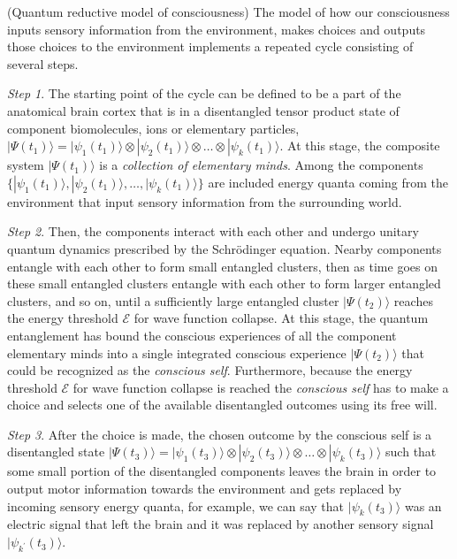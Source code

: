 \documentclass{ws-ijmpb}
\begin{document}
\begin{example}
(Quantum reductive model of consciousness) The model of how our consciousness
inputs sensory information from the environment, makes choices and
outputs those choices to the environment implements a repeated cycle
consisting of several steps. 

\emph{Step 1}. The starting point of the cycle can be defined to be
a part of the anatomical brain cortex that is in a disentangled tensor
product state of component biomolecules, ions or elementary particles,
$|\Psi(t_{1})\rangle=|\psi_{1}(t_{1})\rangle\otimes|\psi_{2}(t_{1})\rangle\otimes\ldots\otimes|\psi_{k}(t_{1})\rangle$.
At this stage, the composite system $|\Psi(t_{1})\rangle$ is a \emph{collection
of elementary minds}. Among the components $\{|\psi_{1}(t_{1})\rangle,|\psi_{2}(t_{1})\rangle,\ldots,|\psi_{k}(t_{1})\rangle\}$
are included energy quanta coming from the environment that input
sensory information from the surrounding world.

\emph{Step 2}. Then, the components interact with each other and undergo
unitary quantum dynamics prescribed by the Schr\"{o}dinger equation. Nearby
components entangle with each other to form small entangled clusters,
then as time goes on these small entangled clusters entangle with
each other to form larger entangled clusters, and so on, until
a sufficiently large entangled cluster $|\Psi(t_{2})\rangle$ reaches
the energy threshold $\mathscr{E}$ for wave function collapse. At
this stage, the quantum entanglement has bound the conscious experiences
of all the component elementary minds into a single integrated conscious
experience $|\Psi(t_{2})\rangle$ that could be recognized as the
\emph{conscious self}. Furthermore, because the energy threshold $\mathscr{E}$
for wave function collapse is reached the \emph{conscious self }has
to make a choice and selects one of the available disentangled outcomes
using its free will.

\emph{Step 3}. After the choice is made, the chosen outcome by the
conscious self is a disentangled state $|\Psi(t_{3})\rangle=|\psi_{1}(t_{3})\rangle\otimes|\psi_{2}(t_{3})\rangle\otimes\ldots\otimes|\psi_{k}(t_{3})\rangle$
such that some small portion of the disentangled components leaves
the brain in order to output motor information towards the environment
and gets replaced by incoming sensory energy quanta, for example,
we can say that $|\psi_{k}(t_{3})\rangle$ was an electric signal
that left the brain and it was replaced by another sensory signal
$|\psi_{k^{\prime}}(t_{3})\rangle$.


\end{example}
\end{document}
